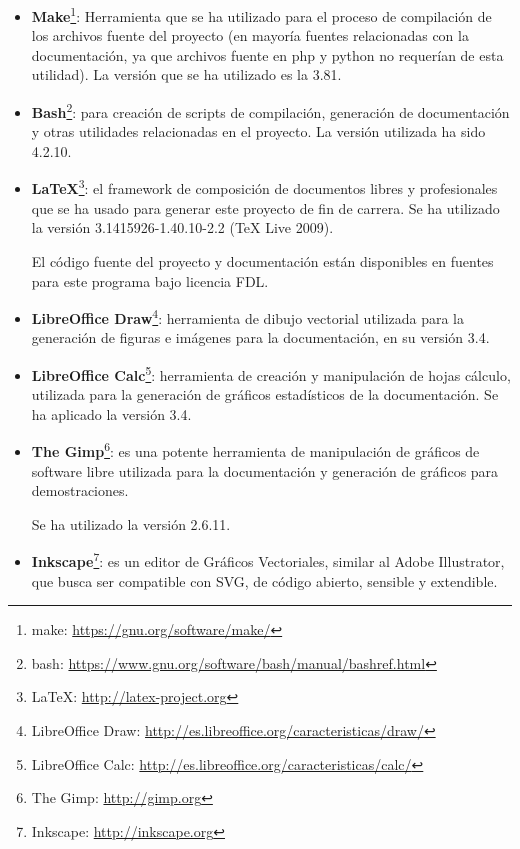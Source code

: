 \begin{itemize}
\item \textbf{Make}\footnote{make:
\url{https://gnu.org/software/make/}\label{ftn:Make}}:
Herramienta que se ha utilizado para el proceso de compilación de los
archivos fuente del proyecto (en mayoría fuentes
relacionadas con la documentación, ya que archivos fuente en php y python
no requerían de esta utilidad). La versión que se ha utilizado es la 3.81.

\item \textbf{Bash}\footnote{bash:
\url{https://www.gnu.org/software/bash/manual/bashref.html}\label{ftn:Bash}}:
para creación de scripts de compilación, generación de documentación y otras utilidades relacionadas en el proyecto. La versión
utilizada ha sido 4.2.10.

\item \textbf{\LaTeX}\footnote{\LaTeX:
\url{http://latex-project.org}\label{ftn:latex}}: el framework de
composición de documentos libres y profesionales que se ha usado para generar este proyecto de fin de carrera.
Se ha utilizado la versión 3.1415926-1.40.10-2.2 (TeX Live 2009).

El código fuente del proyecto y documentación están disponibles en fuentes para este programa
bajo licencia \acs{FDL}\label{acro:FDL}.

\item \textbf{LibreOffice Draw}\footnote{LibreOffice Draw:
\url{http://es.libreoffice.org/caracteristicas/draw/}\label{ftn:Draw}}:
herramienta de dibujo vectorial utilizada para la generación de figuras e imágenes para
la documentación, en su versión 3.4.

\item \textbf{LibreOffice Calc}\footnote{LibreOffice Calc:
\url{http://es.libreoffice.org/caracteristicas/calc/}\label{ftn:Calc}}:
herramienta de creación y manipulación de hojas
cálculo, utilizada para la generación de gráficos estadísticos de la
documentación. Se ha aplicado la
versión 3.4.

\item \textbf{The Gimp}\footnote{The Gimp:
\url{http://gimp.org}\label{ftn:Gimp}}: es una potente
herramienta de manipulación de gráficos de software libre utilizada para
la documentación y generación de gráficos para demostraciones.

Se ha utilizado la versión 2.6.11.

\item \textbf{Inkscape}\footnote{Inkscape:
\url{http://inkscape.org}\label{ftn:Inkscape}}: es un editor de
Gráficos Vectoriales, similar al Adobe Illustrator,
que busca ser compatible con SVG, de código abierto, sensible y
extendible.


\end{itemize}
